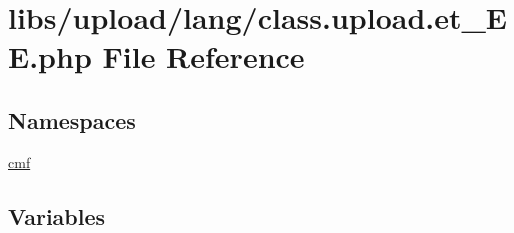 \hypertarget{class_8upload_8et___e_e_8php}{}\section{libs/upload/lang/class.upload.\+et\+\_\+\+E\+E.\+php File Reference}
\label{class_8upload_8et___e_e_8php}
\subsection*{Namespaces}
\begin{DoxyCompactItemize}
\item 
 \hyperlink{namespacecmf}{cmf}
\end{DoxyCompactItemize}
\subsection*{Variables}
